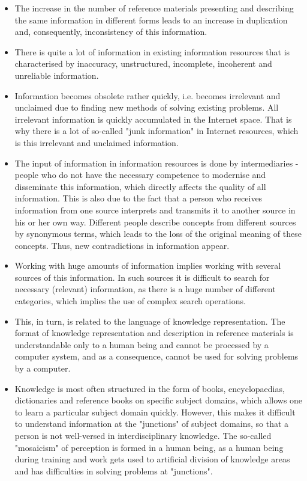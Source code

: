 \documentclass[a4paper]{article}
\begin{document}
\begin{multicols}{2}
\begin{itemize}[leftmargin=5.5mm]
        \item The increase in the number of reference materials
presenting and describing the same information in
different forms leads to an increase in duplication
and, consequently, inconsistency of this information.
        \item There is quite a lot of information in existing information resources that is characterised by inaccuracy,
unstructured, incomplete, incoherent and unreliable
information.
        \item Information becomes obsolete rather quickly, i.e. becomes irrelevant and unclaimed due to finding new
methods of solving existing problems. All irrelevant
information is quickly accumulated in the Internet
space. That is why there is a lot of so-called "junk
information" in Internet resources, which is this
irrelevant and unclaimed information.
        \item The input of information in information resources is
done by intermediaries - people who do not have the
necessary competence to modernise and disseminate
this information, which directly affects the quality of
all information. This is also due to the fact that a
person who receives information from one source
interprets and transmits it to another source in his
or her own way. Different people describe concepts
from different sources by synonymous terms, which
leads to the loss of the original meaning of these
concepts. Thus, new contradictions in information
appear.
        \item Working with huge amounts of information implies
working with several sources of this information. In
such sources it is difficult to search for necessary
(relevant) information, as there is a huge number
of different categories, which implies the use of
complex search operations.
        \item This, in turn, is related to the language of knowledge representation. The format of knowledge representation and description in reference materials is
understandable only to a human being and cannot
be processed by a computer system, and as a consequence, cannot be used for solving problems by a
computer.
        \item Knowledge is most often structured in the form of
books, encyclopaedias, dictionaries and reference
books on specific subject domains, which allows
one to learn a particular subject domain quickly.
However, this makes it difficult to understand information at the "junctions" of subject domains,
so that a person is not well-versed in interdisciplinary knowledge. The so-called "mosaicism" of
perception is formed in a human being, as a human
being during training and work gets used to artificial
division of knowledge areas and has difficulties in
solving problems at "junctions".


\end{itemize}
\end{multicols}
\end{document}
